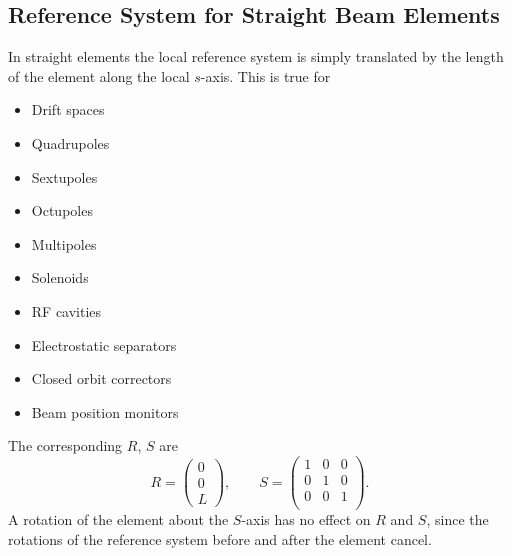 \subsection{Reference System for Straight Beam Elements}
\label{sec:straight}
In straight elements the local reference system 
is simply translated by the length of the element along the local $s$-axis.
This is true for
\begin{itemize}
\item Drift spaces 
\item Quadrupoles 
\item Sextupoles 
\item Octupoles 
\item Multipoles 
\item Solenoids 
\item RF cavities 
\item Electrostatic separators 
\item Closed orbit correctors 
\item Beam position monitors 
\end{itemize}
The corresponding $R$, $S$ are
\[
R=\left(\begin{array}{c}
    0 \\
    0 \\
    L
  \end{array}\right),
\qquad
S=\left(\begin{array}{ccc}
    1 & 0 & 0 \\
    0 & 1 & 0 \\
    0 & 0 & 1 \\
  \end{array}\right).
\]
A rotation of the element about the $S$-axis has no effect
on $R$ and $S$, since the rotations of the reference system
before and after the element cancel.

